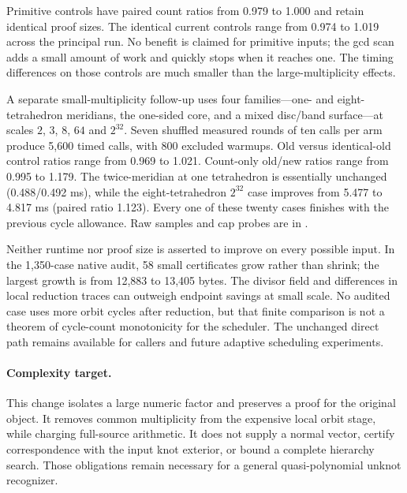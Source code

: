 Primitive controls have paired count ratios from 0.979 to 1.000 and retain
identical proof sizes. The identical current controls range from 0.974 to
1.019 across the principal run. No benefit is claimed for primitive inputs;
the gcd scan adds a small amount of work and quickly stops when it reaches
one. The timing differences on those controls are much smaller than the
large-multiplicity effects.

A separate small-multiplicity follow-up uses four families---one- and
eight-tetrahedron meridians, the one-sided core, and a mixed disc/band
surface---at scales $2$, $3$, $8$, $64$ and $2^{32}$. Seven shuffled
measured rounds of ten calls per arm produce 5,600 timed calls, with 800
excluded warmups. Old versus identical-old control ratios range from
0.969 to 1.021. Count-only old/new ratios range from 0.995 to 1.179.
The twice-meridian at one tetrahedron is essentially unchanged
(0.488/0.492 ms), while the eight-tetrahedron $2^{32}$ case improves from
5.477 to 4.817 ms (paired ratio 1.123). Every one of these twenty cases
finishes with the previous cycle allowance. Raw samples and cap probes are
in .

Neither runtime nor proof size is asserted to improve on every possible
input. In the 1,350-case native audit, 58 small certificates grow rather
than shrink; the largest growth is from 12,883 to 13,405 bytes. The divisor
field and differences in local reduction traces can outweigh endpoint
savings at small scale. No audited case uses more orbit cycles after
reduction, but that finite comparison is not a theorem of cycle-count
monotonicity for the scheduler. The unchanged direct path remains available
for callers and future adaptive scheduling experiments.

\paragraph{Complexity target.}
This change isolates a large numeric factor and preserves a proof for the
original object. It removes common multiplicity from the expensive local
orbit stage, while charging full-source arithmetic. It does not supply a
normal vector, certify correspondence with the input knot exterior, or
bound a complete hierarchy search. Those obligations remain necessary for
a general quasi-polynomial unknot recognizer.
